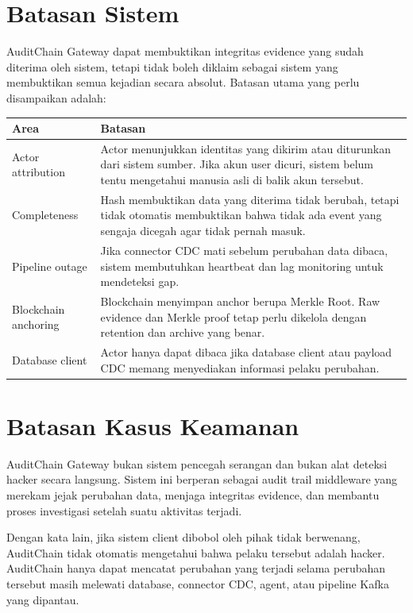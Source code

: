 \section{Batasan Sistem}

AuditChain Gateway dapat membuktikan integritas evidence yang sudah diterima oleh sistem, tetapi tidak boleh diklaim sebagai sistem yang membuktikan semua kejadian secara absolut. Batasan utama yang perlu disampaikan adalah:

\begin{longtable}{p{4.5cm}p{8.5cm}}
\toprule
\textbf{Area} & \textbf{Batasan} \\
\midrule
Actor attribution & Actor menunjukkan identitas yang dikirim atau diturunkan dari sistem sumber. Jika akun user dicuri, sistem belum tentu mengetahui manusia asli di balik akun tersebut. \\
\midrule
Completeness & Hash membuktikan data yang diterima tidak berubah, tetapi tidak otomatis membuktikan bahwa tidak ada event yang sengaja dicegah agar tidak pernah masuk. \\
\midrule
Pipeline outage & Jika connector CDC mati sebelum perubahan data dibaca, sistem membutuhkan heartbeat dan lag monitoring untuk mendeteksi gap. \\
\midrule
Blockchain anchoring & Blockchain menyimpan anchor berupa Merkle Root. Raw evidence dan Merkle proof tetap perlu dikelola dengan retention dan archive yang benar. \\
\midrule
Database client & Actor hanya dapat dibaca jika database client atau payload CDC memang menyediakan informasi pelaku perubahan. \\
\bottomrule
\end{longtable}

\section{Batasan Kasus Keamanan}

AuditChain Gateway bukan sistem pencegah serangan dan bukan alat deteksi hacker secara langsung. Sistem ini berperan sebagai audit trail middleware yang merekam jejak perubahan data, menjaga integritas evidence, dan membantu proses investigasi setelah suatu aktivitas terjadi.

Dengan kata lain, jika sistem client dibobol oleh pihak tidak berwenang, AuditChain tidak otomatis mengetahui bahwa pelaku tersebut adalah hacker. AuditChain hanya dapat mencatat perubahan yang terjadi selama perubahan tersebut masih melewati database, connector CDC, agent, atau pipeline Kafka yang dipantau.

